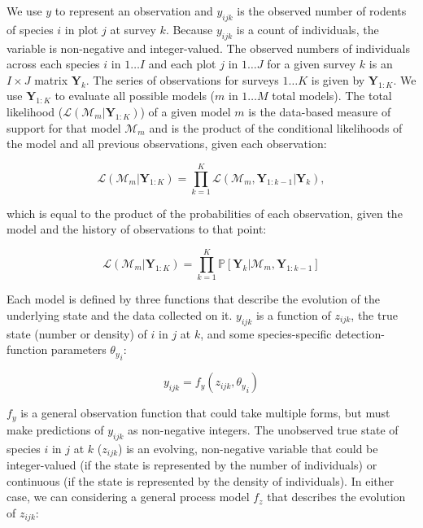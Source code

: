 \documentclass{article}
\begin{document}
We use $y$ to represent an observation and $y_{ijk}$ is the observed number of rodents of species $i$ in plot $j$ at survey $k$. Because $y_{ijk}$ is a count of individuals, the variable is non-negative and integer-valued. The observed numbers of individuals across each species $i$ in $1 \ldots I$ and each plot $j$ in $1 \ldots J$ for a given survey $k$ is an $I \times J$ matrix $\textbf{Y}_k$. The series of observations for surveys $1 \ldots K$ is given by $\textbf{Y}_{1:K}$. We use $\textbf{Y}_{1:K}$ to evaluate all possible models ($m$ in $1 \ldots M$ total models). The total likelihood ($\mathcal{L}(\mathcal{M}_m|\textbf{Y}_{1:K})$) of a given model $m$ is the data-based measure of support for that model $\mathcal{M}_m$ and is the product of the conditional likelihoods of the model and all previous observations, given each observation:

\begin{equation}
\mathcal{L}(\mathcal{M}_m|\textbf{Y}_{1:K}) = \prod_{k = 1}^{K}{\mathcal{L}(\mathcal{M}_m, \textbf{Y}_{1:k-1}|\textbf{Y}_{k})},
\end{equation}

which is equal to the product of the probabilities of each observation, given the model and the history of observations to that point:

\begin{equation}
\mathcal{L}(\mathcal{M}_m|\textbf{Y}_{1:K}) = \prod_{k = 1}^{K}{\mathbb{P}[\textbf{Y}_{k}|\mathcal{M}_m, \textbf{Y}_{1:k-1}]}
\end{equation}

Each model is defined by three functions that describe the evolution of the underlying state and the data collected on it. $y_{ijk}$ is a function of $z_{ijk}$, the true state (number or density) of $i$ in $j$ at $k$, and some species-specific detection-function parameters ${\theta_{y}}_i$:

\begin{equation}
y_{ijk} = f_y(z_{ijk}, {\theta_{y}}_i)
\end{equation}

$f_y$ is a general observation function that could take multiple forms, but must make predictions of $y_{ijk}$ as non-negative integers. The unobserved true state of species $i$ in $j$ at $k$ ($z_{ijk}$) is an evolving, non-negative variable that could be integer-valued (if the state is represented by the number of individuals) or continuous (if the state is represented by the density of individuals). In either case, we can considering a general process model $f_z$ that describes the evolution of $z_{ijk}$:
\end{document}
